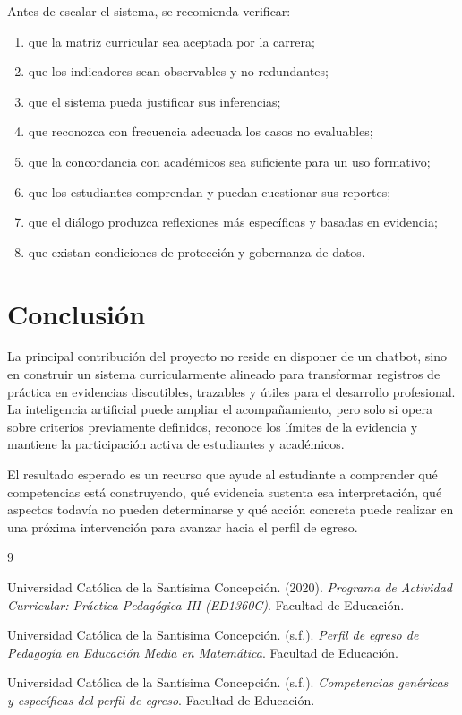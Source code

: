 \documentclass[11pt,a4paper]{article}
\begin{document}
Antes de escalar el sistema, se recomienda verificar:

\begin{enumerate}
    \item que la matriz curricular sea aceptada por la carrera;
    \item que los indicadores sean observables y no redundantes;
    \item que el sistema pueda justificar sus inferencias;
    \item que reconozca con frecuencia adecuada los casos no evaluables;
    \item que la concordancia con académicos sea suficiente para un uso formativo;
    \item que los estudiantes comprendan y puedan cuestionar sus reportes;
    \item que el diálogo produzca reflexiones más específicas y basadas en evidencia;
    \item que existan condiciones de protección y gobernanza de datos.
\end{enumerate}

\section{Conclusión}

La principal contribución del proyecto no reside en disponer de un chatbot, sino en construir un sistema curricularmente alineado para transformar registros de práctica en evidencias discutibles, trazables y útiles para el desarrollo profesional. La inteligencia artificial puede ampliar el acompañamiento, pero solo si opera sobre criterios previamente definidos, reconoce los límites de la evidencia y mantiene la participación activa de estudiantes y académicos.

El resultado esperado es un recurso que ayude al estudiante a comprender qué competencias está construyendo, qué evidencia sustenta esa interpretación, qué aspectos todavía no pueden determinarse y qué acción concreta puede realizar en una próxima intervención para avanzar hacia el perfil de egreso.

\begin{thebibliography}{9}

Universidad Católica de la Santísima Concepción. (2020).
\textit{Programa de Actividad Curricular: Práctica Pedagógica III (ED1360C)}.
Facultad de Educación.

Universidad Católica de la Santísima Concepción. (s.f.).
\textit{Perfil de egreso de Pedagogía en Educación Media en Matemática}.
Facultad de Educación.

Universidad Católica de la Santísima Concepción. (s.f.).
\textit{Competencias genéricas y específicas del perfil de egreso}.
Facultad de Educación.

\end{thebibliography}
\end{document}
